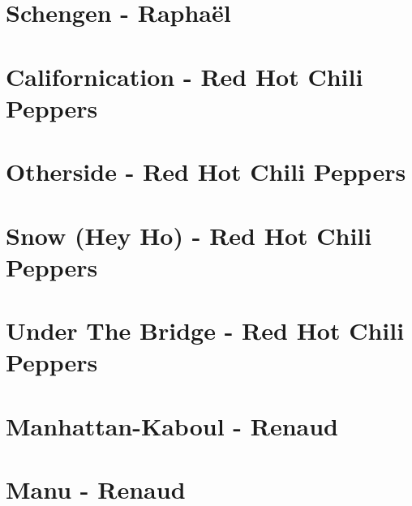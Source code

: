\documentclass[11pt]{article}
\begin{document}
\section{Schengen - Raphaël}
\begin{guitar}

\end{guitar}

\section*{Californication - Red Hot Chili Peppers}
\begin{guitar}

\end{guitar}

\section*{Otherside - Red Hot Chili Peppers}
\begin{guitar}

\end{guitar}

\section{Snow  (Hey Ho) - Red Hot Chili Peppers}
\begin{guitar}

\end{guitar}

\section*{Under The Bridge - Red Hot Chili Peppers}
\begin{guitar}

\end{guitar}



\section{Manhattan-Kaboul - Renaud}
\begin{guitar}

\end{guitar}

\section{Manu - Renaud}
\begin{guitar}

\end{guitar}
\end{document}
